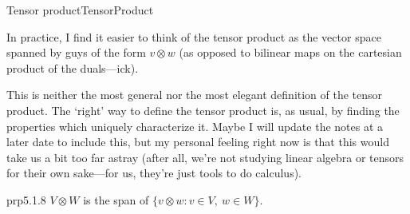 \begin{dfn}{Tensor product}{TensorProduct}
\begin{rmk}
\end{rmk}
\begin{rmk}
In practice, I find it easier to think of the tensor product as the vector space spanned by guys of the form $v\otimes w$ (as opposed to bilinear maps on the cartesian product of the duals---ick).
\end{rmk}
\begin{rmk}
This is neither the most general nor the most elegant definition of the tensor product.  The `right' way to define the tensor product is, as usual, by finding the properties which uniquely characterize it.  Maybe I will update the notes at a later date to include this, but my personal feeling right now is that this would take us a bit too far astray (after all, we're not studying linear algebra or tensors for their own sake---for us, they're just tools to do calculus).
\end{rmk}
\end{dfn}
\begin{prp}{}{prp5.1.8}
$V\otimes W$ is the span of $\{ v\otimes w:v\in V,\ w\in W\}$.
\end{prp}
